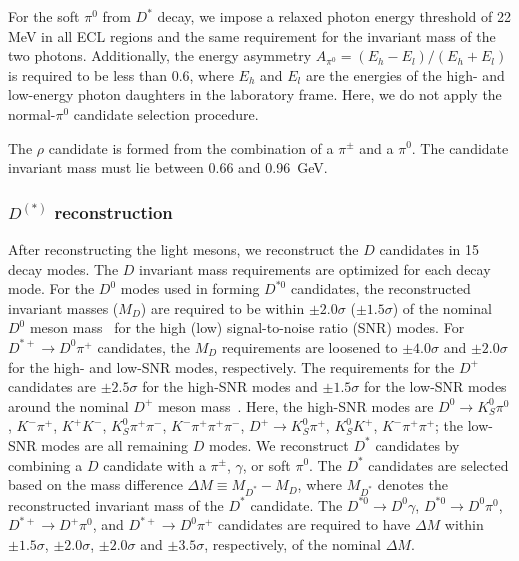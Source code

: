 \documentclass[aps,prd,twocolumn,superscriptaddress,showpacs,preprintnumbers,amsmath,amssymb]{revtex4-1}
\begin{document}
For the soft $\pi^0$ from $D^*$ decay, we impose a relaxed photon energy threshold of 22 MeV in all ECL regions and the same requirement for the invariant mass of the two photons. Additionally, the energy asymmetry $A_{\pi^0} = (E_h - E_l)/(E_h + E_l)$ is required to be less than 0.6, where $E_h$ and $E_l$ are the energies of the high- and low-energy photon daughters in the laboratory frame. Here, we do not apply the normal-$\pi^0$ candidate selection procedure.


The $\rho$ candidate is formed from the combination of a $\pi^{\pm}$ and a $\pi^0$. The candidate invariant mass must lie between 0.66 and 0.96~GeV.

\subsubsection{$D^{(*)}$ reconstruction}\label{sec:recon-Dst-recon}

After reconstructing the light mesons, we reconstruct the $D$ candidates in 15 decay modes. The $D$ invariant mass requirements are optimized for each decay mode. For the $D^0$ modes used in forming $D^{*0}$ candidates, the reconstructed invariant masses ($M_D$) are required to be within $\pm 2.0\sigma$ ($\pm 1.5\sigma$) of the nominal $D^0$ meson mass~\cite{cite:PDG:2016} for the high (low) signal-to-noise ratio (SNR) modes. For $D^{*+} \rightarrow D^0 \pi^+$ candidates, the $M_D$ requirements are loosened to $\pm 4.0\sigma$ and $\pm 2.0\sigma$ for the high- and low-SNR modes, respectively. The requirements for the $D^+$ candidates are $\pm 2.5\sigma$ for the high-SNR modes and $\pm 1.5\sigma$ for the low-SNR modes around the nominal $D^+$ meson mass~\cite{cite:PDG:2016}. Here, the high-SNR modes are $D^0 \rightarrow K_S^0 \pi^0$, $K^- \pi^+$, $K^+ K^-$, $K_S^0 \pi^+ \pi^-$, $K^- \pi^+ \pi^+ \pi^-$, $D^+ \rightarrow K_S^0 \pi^+$, $K_S^0 K^+$, $K^- \pi^+ \pi^+$; the low-SNR modes are all remaining $D$ modes. We reconstruct $D^*$ candidates by combining a $D$ candidate with a $\pi^{\pm}$, $\gamma$, or soft $\pi^0$. The $D^*$ candidates are selected based on the mass difference $\Delta M \equiv M_{D^*} - M_D$, where $M_{D^*}$ denotes the reconstructed invariant mass of the $D^*$ candidate. The $D^{*0} \rightarrow D^0 \gamma$, $D^{*0} \rightarrow D^0 \pi^0$, $D^{*+} \rightarrow D^+ \pi^0$, and $D^{*+} \rightarrow D^0 \pi^+$ candidates are required to have $\Delta M$ within $\pm 1.5\sigma$, $\pm 2.0\sigma$, $\pm 2.0\sigma$ and $\pm 3.5\sigma$, respectively, of the nominal $\Delta M$.
\end{document}
